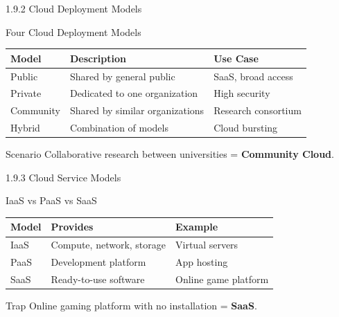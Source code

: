 \documentclass{beamer}
\begin{document}
	\begin{frame}{1.9.2 Cloud Deployment Models}
		\begin{block}{Four Cloud Deployment Models}
			\begin{tabular}{|p{2cm}|p{4.5cm}|p{4.5cm}|}
				\hline
				\textbf{Model} & \textbf{Description} & \textbf{Use Case} \\
				\hline
				Public & Shared by general public & SaaS, broad access \\
				\hline
				Private & Dedicated to one organization & High security \\
				\hline
				Community & Shared by similar organizations & Research consortium \\
				\hline
				Hybrid & Combination of models & Cloud bursting \\
				\hline
			\end{tabular}
		\end{block}
		\begin{exampleblock}{Scenario}
			Collaborative research between universities = \textbf{Community Cloud}.
		\end{exampleblock}
	\end{frame}
	
	\begin{frame}{1.9.3 Cloud Service Models}
		\begin{block}{IaaS vs PaaS vs SaaS}
			\begin{tabular}{|p{2cm}|p{5cm}|p{4cm}|}
				\hline
				\textbf{Model} & \textbf{Provides} & \textbf{Example} \\
				\hline
				IaaS & Compute, network, storage & Virtual servers \\
				\hline
				PaaS & Development platform & App hosting \\
				\hline
				SaaS & Ready-to-use software & Online game platform \\
				\hline
			\end{tabular}
		\end{block}
		\begin{alertblock}{Trap}
			Online gaming platform with no installation = \textbf{SaaS}.
		\end{alertblock}
	\end{frame}
	
\end{document}
